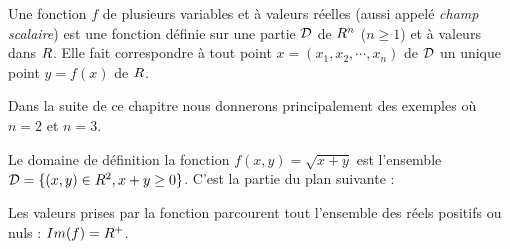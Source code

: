 \sld{\vfill\pagebreak[5]}%
\begin{definition}
    Une fonction $f$ de plusieurs variables et à valeurs réelles (aussi appelé \emph{champ scalaire}) est une fonction définie sur une partie $\mathcal{D}$ de $R^n$ ($n\geq 1$) et à valeurs dans $R$. Elle fait correspondre à tout point $x =(x_1,x_2,\cdots,x_n)$ de $\mathcal{D}$ un unique point $y = f(x)$ de $R$.
\end{definition}

Dans la suite de ce chapitre nous donnerons principalement des exemples où $n=2$ et $n=3$. %

\sld{\vfill\pagebreak[5]}%
\begin{exemple} \label{exemple.fpv}
    Le domaine de définition la fonction $f(x,y) = \sqrt{x+y}$ est l'ensemble $\mathcal{D} = \{(x,y) \in R^2, x + y \geq  0\}$. C'est la partie du plan suivante :
    \begin{center}
        \begin{minipage}{5cm}
             
        \end{minipage}
%						
    \end{center}
    Les valeurs prises par la fonction parcourent tout l'ensemble des réels positifs ou nuls : $Im(f) = R^+$.
\end{exemple}

